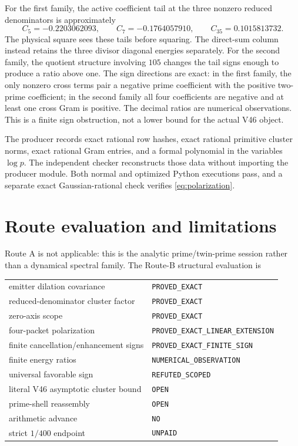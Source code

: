 \documentclass[11pt]{article}
\theoremstyle{definition}
\theoremstyle{remark}
\begin{document}
For the first family, the active coefficient tail at the three nonzero reduced
denominators is approximately
\[
 C_5=-0.2203062093,\qquad C_7=-0.1764057910,\qquad
 C_{35}=0.1015813732.
\]
The physical square sees these tails before squaring.  The direct-sum column
instead retains the three divisor diagonal energies separately.  For the second
family, the quotient structure involving $105$ changes the tail signs enough to
produce a ratio above one.  The sign directions are exact: in the first family,
the only nonzero cross terms pair a negative prime coefficient with the positive
two-prime coefficient; in the second family all four coefficients are negative
and at least one cross Gram is positive.  The decimal ratios are numerical
observations.  This is a finite sign obstruction, not a lower bound
for the actual V46 object.

The producer records exact rational row hashes, exact rational primitive cluster
norms, exact rational Gram entries, and a formal polynomial in the variables
$\log p$.  The independent checker reconstructs those data without importing
the producer module.  Both normal and optimized Python executions pass, and a
separate exact Gaussian-rational check verifies \eqref{eq:polarization}.

\section{Route evaluation and limitations}

Route A is not applicable: this is the analytic prime/twin-prime session rather
than a dynamical spectral family.  The Route-B structural evaluation is
\begin{center}
\begin{tabular}{ll}
\toprule
emitter dilation covariance & \texttt{PROVED\_EXACT} \\
reduced-denominator cluster factor & \texttt{PROVED\_EXACT} \\
zero-axis scope & \texttt{PROVED\_EXACT} \\
four-packet polarization & \texttt{PROVED\_EXACT\_LINEAR\_EXTENSION} \\
finite cancellation/enhancement signs & \texttt{PROVED\_EXACT\_FINITE\_SIGN} \\
finite energy ratios & \texttt{NUMERICAL\_OBSERVATION} \\
universal favorable sign & \texttt{REFUTED\_SCOPED} \\
literal V46 asymptotic cluster bound & \texttt{OPEN} \\
prime-shell reassembly & \texttt{OPEN} \\
arithmetic advance & \texttt{NO} \\
strict $1/400$ endpoint & \texttt{UNPAID} \\
\bottomrule
\end{tabular}
\end{center}
\end{document}
